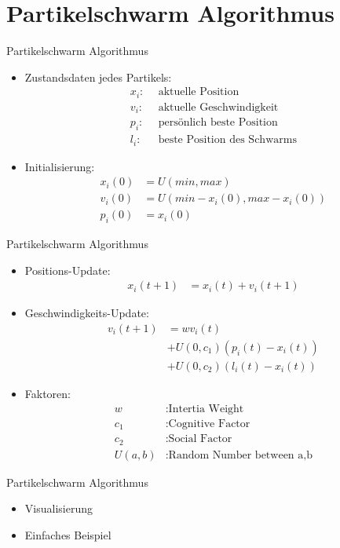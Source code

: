 \section[Algorithmus]{Partikelschwarm Algorithmus}
\begin{frame}{Partikelschwarm Algorithmus}
\begin{itemize}

	\item Zustandsdaten jedes Partikels:
	\begin{align*}
		x_i: \: \: & \text{aktuelle Position}\\
		v_i: \: \: & \text{aktuelle Geschwindigkeit}\\
		p_i: \: \: & \text{persönlich beste Position} \\
		l_i: \: \: & \text{beste Position des Schwarms}
	\end{align*}
	

	\item Initialisierung:
	\begin{align*}
		x_i(0) &= U(min,max) \\
		v_i(0) &= U(min - x_i(0), max - x_i(0)) \\
		p_i(0) &= x_i(0)
	\end{align*}

\end{itemize}	
\end{frame}

\begin{frame}{Partikelschwarm Algorithmus}
\begin{itemize}
	\item Positions-Update: 
	\begin{align*}
		x_{i}(t+1) &= x_i(t) + v_i(t+1)
	\end{align*}
	
	\item Geschwindigkeits-Update:
	\begin{align*}
		v_i(t+1) &= w v_i(t) \\
				&+ U(0,c_1) \left(p_i(t)-x_i(t) \right) \\
				&+ U(0,c_2) \left(l_i(t)-x_i(t) \right)
	\end{align*}
	
	\item Faktoren: 
	\begin{align*}
		w &: \text{Intertia Weight} \\
		c_1 &: \text{Cognitive Factor} \\
		c_2 &: \text{Social Factor} \\
		U(a,b) &: \text{Random Number between a,b}
	\end{align*}
\end{itemize}	
\end{frame}

\begin{frame}{Partikelschwarm Algorithmus}
	\begin{itemize}
		\item Visualisierung
			\only<1>{\begin{figure}[htbp]
				
			\end{figure}}
		\item Einfaches Beispiel
	\end{itemize}
\end{frame}